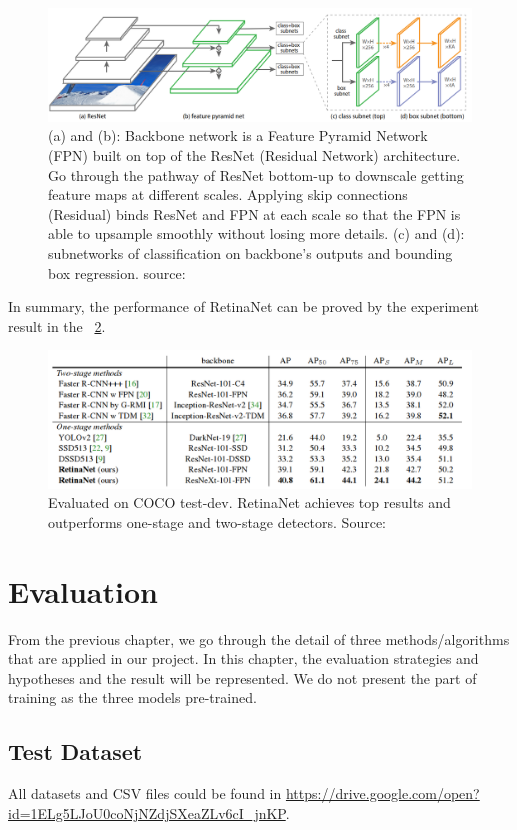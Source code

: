 \documentclass[runningheads]{llncs}
\begin{document}
\begin{figure}[H]
\includegraphics[width=\textwidth]{figs/RetinaNet_network.png}
\caption{(a) and (b): Backbone network is a Feature Pyramid Network (FPN) built on top of the ResNet (Residual Network) architecture. Go through the pathway of ResNet bottom-up to downscale getting feature maps at different scales. Applying skip connections (Residual) binds ResNet and FPN at each scale so that the FPN is able to upsample smoothly without losing more details. (c) and (d): subnetworks of classification on backbone’s outputs and bounding box regression. source: ~\cite{ref_retinanet}} \label{fig8}
\end{figure}

In summary, the performance of RetinaNet can be proved by the experiment result in the ~\ref{fig9}.
\begin{figure}[htbp]
\includegraphics[width=\textwidth]{figs/RetinaNet_object_detection.png}
\caption{Evaluated on COCO test-dev. RetinaNet achieves top results and outperforms one-stage and two-stage detectors. Source: ~\cite{ref_retinanet}} \label{fig9}
\end{figure}


\section{Evaluation}
From the previous chapter, we go through the detail of three methods/algorithms that are applied in our project. In this chapter, the evaluation strategies and hypotheses and the result will be represented. We do not present the part of training as the three models pre-trained. 

\subsection{Test Dataset}
All datasets and CSV files could be found in \url{https://drive.google.com/open?id=1ELg5LJoU0coNjNZdjSXeaZLv6cI_jnKP}.
\end{document}

